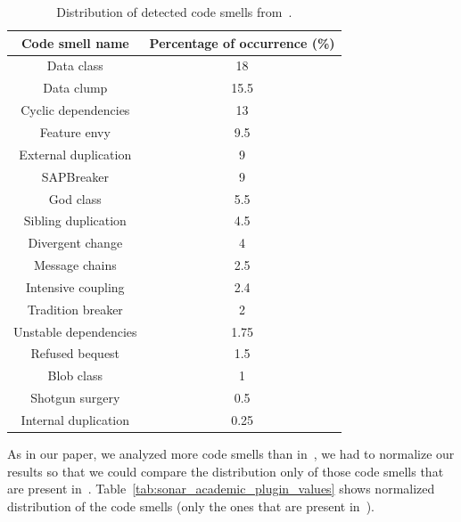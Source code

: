 \begin{table}
    \begin{center}
        \begin{tabular} {| c | c |}
            \hline
            \textbf{Code smell name} & \textbf{Percentage of occurrence (\%)} \\ \hline
            Data class & 18 \\ \hline
            Data clump & 15.5 \\ \hline
            Cyclic dependencies & 13 \\ \hline
            Feature envy & 9.5 \\ \hline
            External duplication & 9 \\ \hline
            SAPBreaker & 9 \\ \hline
            God class & 5.5 \\ \hline
            Sibling duplication & 4.5 \\ \hline
            Divergent change & 4 \\ \hline
            Message chains & 2.5 \\ \hline
            Intensive coupling & 2.4 \\ \hline
            Tradition breaker & 2 \\ \hline
            Unstable dependencies & 1.75 \\ \hline
            Refused bequest & 1.5 \\ \hline
            Blob class & 1 \\ \hline
            Shotgun surgery & 0.5 \\ \hline
            Internal duplication & 0.25 \\ \hline
        \end{tabular}
        \caption{Distribution of detected code smells from~\cite{mannan2016understanding}.}
        \label{tab:understading_andoid_smells_values}
    \end{center}
\end{table}

As in our paper, we analyzed more code smells than in~\cite{mannan2016understanding}, we had to normalize
our results so that we could compare the distribution only of those code smells that are present in~\cite{mannan2016understanding}.
Table~\ref{tab:sonar_academic_plugin_values} shows normalized distribution of the code smells (only the ones that
are present in~\cite{mannan2016understanding}).

